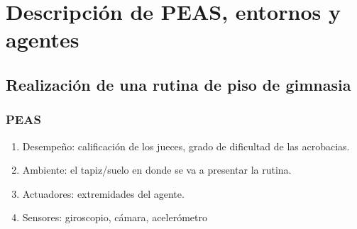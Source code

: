 \documentclass{article}
\begin{document}
    \section{Descripción de PEAS, entornos y agentes}

        \subsection{Realización de una rutina de piso de gimnasia}
            \subsubsection{PEAS}
                \begin{enumerate}
                    \item Desempeño: calificación de los jueces, grado de dificultad de las acrobacias.
                    \item Ambiente: el tapiz/suelo en donde se va a presentar la rutina.
                    \item Actuadores: extremidades del agente.
                    \item Sensores: giroscopio, cámara, acelerómetro                    
                \end{enumerate}
\end{document}
